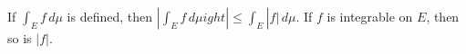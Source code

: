 If $\int_E f \, d\mu$ is defined, then $\left| \int_E f \, d\mu 
ight| \leq \int_E |f| \, d\mu$. If $f$ is integrable on $E$, then so is $|f|$.
